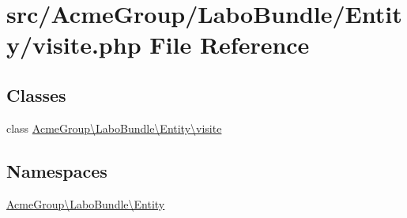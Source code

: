 \hypertarget{_labo_bundle_2_entity_2visite_8php}{\section{src/\+Acme\+Group/\+Labo\+Bundle/\+Entity/visite.php File Reference}
\label{_labo_bundle_2_entity_2visite_8php}
}
\subsection*{Classes}
\begin{DoxyCompactItemize}
\item 
class \hyperlink{class_acme_group_1_1_labo_bundle_1_1_entity_1_1visite}{Acme\+Group\textbackslash{}\+Labo\+Bundle\textbackslash{}\+Entity\textbackslash{}visite}
\end{DoxyCompactItemize}
\subsection*{Namespaces}
\begin{DoxyCompactItemize}
\item 
 \hyperlink{namespace_acme_group_1_1_labo_bundle_1_1_entity}{Acme\+Group\textbackslash{}\+Labo\+Bundle\textbackslash{}\+Entity}
\end{DoxyCompactItemize}
